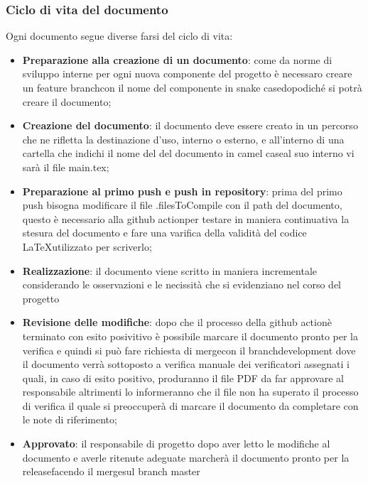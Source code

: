   \subsubsection{Ciclo di vita del documento}
  Ogni documento segue diverse farsi del ciclo di vita:
  \begin{itemize}
    \item \textbf{Preparazione alla creazione di un documento}: come da norme di sviluppo interne per ogni nuova componente del progetto è necessaro creare un feature branch\glo con il nome del componente in snake case\glo dopodich\'e si potr\`a creare il documento;

    \item \textbf{Creazione del documento}: il documento deve essere creato in un percorso che ne rifletta la destinazione d'uso, interno o esterno, e all'interno di una cartella che indichi il nome del del documento in camel case\glo al suo interno vi sar\`a il file main.tex;

    \item \textbf{Preparazione al primo push e push in repository}: prima del primo push bisogna modificare il file .filesToCompile con il path del documento, questo è necessario alla github action\glo per testare in maniera continuativa la stesura del documento e fare una varifica della validit\`a del codice \LaTeX \space utilizzato per scriverlo;

    \item \textbf{Realizzazione}: il documento viene scritto in maniera incrementale considerando le osservazioni e le necissit\`a che si evidenziano nel corso del progetto

    \item \textbf{Revisione delle modifiche}: dopo che il processo della github action\glo è terminato con esito posivitivo è possibile marcare il documento pronto per la verifica e quindi si può fare richiesta di merge\glo con il branch\glo development dove il documento verr\`a sottoposto a verifica manuale dei verificatori assegnati i quali, in caso di esito positivo, produranno il file PDF da far approvare al responsabile altrimenti lo informeranno  che il file non ha superato il processo di verifica il quale si preoccuper\`a di marcare il documento da completare con le note di riferimento;

    \item \textbf{Approvato}: il responsabile di progetto dopo aver letto le modifiche al documento e averle ritenute adeguate marcher\`a il documento pronto per la release\glo facendo il merge\glo sul branch master\glo
  \end{itemize}
